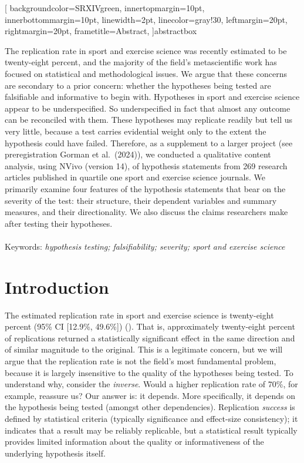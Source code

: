 \documentclass[
]{article}
\begin{document}
\newenvironment{abstractbox}
  {}

\surroundwithmdframed[
  backgroundcolor=SRXIVgreen,
  innertopmargin=10pt,
  innerbottommargin=10pt,
  linewidth=2pt,
  linecolor=gray!30,
  leftmargin=20pt,
  rightmargin=20pt,
  frametitle={\large{Abstract}},
]{abstractbox}

\begin{abstractbox}
  The replication rate in sport and exercise science was recently
estimated to be twenty-eight percent, and the majority of the field's
metascientific work has focused on statistical and methodological
issues. We argue that these concerns are secondary to a prior concern:
whether the hypotheses being tested are falsifiable and informative to
begin with. Hypotheses in sport and exercise science appear to be
underspecified. So underspecified in fact that almost any outcome can be
reconciled with them. These hypotheses may replicate readily but tell us
very little, because a test carries evidential weight only to the extent
the hypothesis could have failed. Therefore, as a supplement to a larger
project (see preregistration Gorman et al.~(2024)), we conducted a
qualitative content analysis, using NVivo (version 14), of hypothesis
statements from 269 research articles published in quartile one sport
and exercise science journals. We primarily examine four features of the
hypothesis statements that bear on the severity of the test: their
structure, their dependent variables and summary measures, and their
directionality. We also discuss the claims researchers make after
testing their hypotheses. 
    \\ \\
  Keywords: \emph{hypothesis testing; falsifiability; severity; sport
and exercise science}
   
\end{abstractbox}

\section{Introduction}\label{introduction}

The estimated replication rate in sport and exercise science is
twenty-eight percent (95\% CI {[}12.9\%, 49.6\%{]})
(). That is,
approximately twenty-eight percent of replications returned a
statistically significant effect in the same direction and of similar
magnitude to the original. This is a legitimate concern, but we will
argue that the replication rate is not the field's most fundamental
problem, because it is largely insensitive to the quality of the
hypotheses being tested. To understand why, consider the \emph{inverse}.
Would a higher replication rate of 70\%, for example, reassure us? Our
answer is: it depends. More specifically, it depends on the hypothesis
being tested (amongst other dependencies). Replication \emph{success} is
defined by statistical criteria (typically significance and effect-size
consistency); it indicates that a result may be reliably replicable, but
a statistical result typically provides limited information about the
quality or informativeness of the underlying hypothesis itself.
\end{document}
